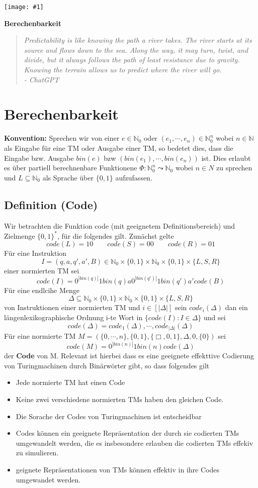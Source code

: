 \documentclass[a4paper,11pt]{article}
\newcommand{\coversection}[3]{
  \newpage
  \thispagestyle{empty}
  \begin{center}
    \vspace*{\fill}
    \texttt{[image: \#1]}
    \vspace*{0.5cm} %
    \par
    \Large\textbf{#2}
    \par\vspace{0.5cm} %
    \begin{quote}
      \itshape\small\raggedleft #3
    \end{quote}
    \par\vspace{\fill}
  \end{center}
  \newpage
}
\begin{document}
\coversection{predic.png}{Berechenbarkeit}{Predictability is like knowing the path a river takes. The river starts at its source and flows down to the sea. Along the way, it may turn, twist, and divide, but it always follows the path of least resistance due to gravity. Knowing the terrain allows us to predict where the river will go.\\ \hspace*{\fill} - ChatGPT}

\section{Berechenbarkeit} \textbf{Konvention: } Sprechen wir von einer $e \in \mathbb{N}_0$ oder $(e_1, \cdots, e_n) \in \mathbb{N}_0^n$ wobei $n \in \mathbb{N}$ als Eingabe für eine TM oder Ausgabe einer TM, so bedetet dies, dass die Eingabe bzw. Ausgabe $bin(e)$ bzw $(bin(e_1), \cdots, bin(e_n))$ ist. Dies erlaubt es über partiell berechnenbare Funktionene $\Phi: \mathbb{N}_0^n \leadsto \mathbb{N}_0$ wobei $n\in N$ zu sprechen und $L \subseteq \mathbb{N}_0$ als Sprache über $\{0, 1\}$ aufzufassen.

\subsection{Definition (Code)} Wir betrachten die Funktion code (mit geeignetem Definitionsbereich) und Zielmenge $\{0, 1\}^*$, für die folgendes gilt. Zunächst gelte \[code(L) = 10 \qquad code (S) = 00 \qquad code(R) = 01\] Für eine Instruktion \[ I = (q, a, q', a', B) \in \mathbb{N}_0 \times \{0, 1\} \times \mathbb{N}_0 \times \{0, 1\} \times \{L, S, R\}\] einer normierten TM sei \[code (I) = 0^{|bin(q)|} 1 bin (q) a 0^{|bin(q')|} 1 bin (q') a' code (B)\] Für eine endlcihe Menge \[ \Delta \subseteq \mathbb{N}_0 \times \{0, 1\} \times \mathbb{N}_0 \times \{0, 1\}\times \{L, S, R\}\] von Instruktionen einer normierten TM und $i \in [|\Delta|]$ sein $code_i(\Delta)$ dan ein längenlexikographische Ordnung i-te Wort in $\{code(I): I \in \Delta\}$ und sei \[ code (\Delta) = code_1(\Delta), \cdots, code_{|\Delta|}(\Delta)\] Für eine normierte TM $M = (\{0, \cdots, n\}, \{0, 1\}, \{\Box, 0, 1\}, \Delta, 0, \{0\})$ sei \[ code (M) = 0^{|bin(n)|} 1 bin (n) code (\Delta)\] der \textbf{Code} von M. Relevant ist hierbei dass es eine geeignete effekttive Codierung von Turingmachinen durch Binärwörter gibt, so dass folgendes gilt 
\begin{itemize}
  \item Jede normierte TM hat einen Code 
  \item Keine zwei verschiedene normierten TMs haben den gleichen Code.
  \item Die Sorache der Codes von Turingmachinen ist entscheidbar
  \item Codes können ein geeignete Repräsentation der durch sie codierten TMs umgewandelt werden, die es insbesondere erlauben die codierten TMs effekiv zu simulieren.
  \item geignete Repräsentationen von TMs können effektiv in ihre Codes umgewandet werden.
\end{itemize}
\end{document}
